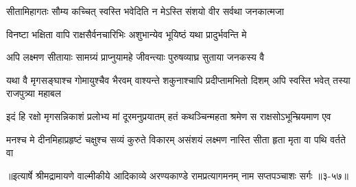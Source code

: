 \twolineshloka
{सीतामिहागतः सौम्य कच्चित् स्वस्ति भवेदिति}
{न मेऽस्ति संशयो वीर सर्वथा जनकात्मजा} %

\twolineshloka
{विनष्टा भक्षिता वापि राक्षसैर्वनचारिभिः}
{अशुभान्येव भूयिष्ठं यथा प्रादुर्भवन्ति मे} %

\twolineshloka
{अपि लक्ष्मण सीतायाः सामग्र्यं प्राप्नुयामहे}
{जीवन्त्याः पुरुषव्याघ्र सुताया जनकस्य वै} %

\threelineshloka
{यथा वै मृगसङ्घाश्च गोमायुश्चैव भैरवम्}
{वाश्यन्ते शकुनाश्चापि प्रदीप्तामभितो दिशम्}
{अपि स्वस्ति भवेत् तस्या राजपुत्र्या महाबल} %

\twolineshloka
{इदं हि रक्षो मृगसन्निकाशं प्रलोभ्य मां दूरमनुप्रयातम्}
{हतं कथञ्चिन्महता श्रमेण स राक्षसोऽभून्म्रियमाण एव} %

\twolineshloka
{मनश्च मे दीनमिहाप्रहृष्टं चक्षुश्च सव्यं कुरुते विकारम्}
{असंशयं लक्ष्मण नास्ति सीता हृता मृता वा पथि वर्तते वा} %


॥इत्यार्षे श्रीमद्रामायणे वाल्मीकीये आदिकाव्ये अरण्यकाण्डे रामप्रत्यागमनम् नाम सप्तपञ्चाशः सर्गः ॥३-५७॥
